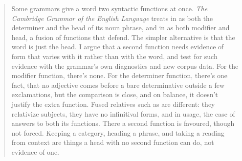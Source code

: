 
\begin{abstract}
Some grammars give a word two syntactic functions at once. \textit{The Cambridge Grammar of the English Language} treats  in  as both the determiner and the head of its noun phrase, and  in  as both modifier and head, a fusion of functions that \textcite{Payne2007} defend. The simpler alternative is that the word is just the head. I argue that a second function needs evidence of form that varies with it rather than with the word, and test for such evidence with the grammar's own diagnostics and new corpus data. For the modifier function, there's none. For the determiner function, there's one fact, that no adjective comes before a bare determinative outside a few exclamations, but the comparison is close, and on balance, it doesn't justify the extra function. Fused relatives such as  are different: they relativize subjects, they have no infinitival forms, and in usage, the case of  answers to both its functions. There a second function is favoured, though not forced. Keeping a category, heading a phrase, and taking a reading from context are things a head with no second function can do, not evidence of one.
\end{abstract}
